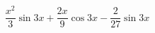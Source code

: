 \begin{displaymath}
 \frac{x^2}{3}\sin3x + \frac{2x}{9}\cos 3x -\frac{2}{27}\sin3x
\end{displaymath}
